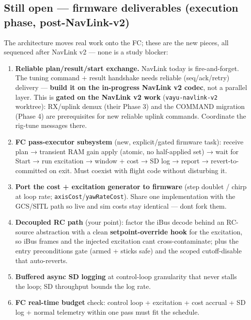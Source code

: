 \documentclass[
  11pt,
]{article}
\providecommand{\tightlist}{%
  \setlength{\itemsep}{0pt}\setlength{\parskip}{0pt}}
\begin{document}
\hypertarget{still-open--firmware-deliverables-execution-phase-post-navlink-v2}{%
\subsection{Still open --- firmware deliverables (execution phase,
post-NavLink-v2)}\label{still-open--firmware-deliverables-execution-phase-post-navlink-v2}}

The architecture moves real work onto the FC; these are the new pieces,
all sequenced after NavLink v2 --- none is a study blocker:

\begin{enumerate}
\def\labelenumi{\arabic{enumi}.}
\tightlist
\item
  \textbf{Reliable plan/result/start exchange.} NavLink today is
  fire-and-forget. The tuning command + result handshake needs reliable
  (seq/ack/retry) delivery --- \textbf{build it on the in-progress
  NavLink v2 codec}, not a parallel layer. This is \textbf{gated on the
  NavLink v2 work} (\texttt{vayu-navlink-v2} worktree): RX/uplink demux
  (their Phase 3) and the COMMAND migration (Phase 4) are prerequisites
  for new reliable uplink commands. Coordinate the rig-tune messages
  there.
\item
  \textbf{FC pass-executor subsystem} (new, explicit/gated firmware
  task): receive plan → transient RAM gain apply (atomic, no
  half-applied set) → wait for Start → run excitation → window + cost →
  SD log → report → revert-to-committed on exit. Must coexist with
  flight code without disturbing it.
\item
  \textbf{Port the cost + excitation generator to firmware} (step
  doublet / chirp at loop rate; \texttt{axisCost}/\texttt{yawRateCost}).
  Share one implementation with the GCS/SITL path so live and sim costs
  stay identical --- don\textquotesingle t fork them.
\item
  \textbf{Decoupled RC path} (your point): factor the iBus decode behind
  an RC-source abstraction with a clean \textbf{setpoint-override hook}
  for the excitation, so iBus frames and the injected excitation
  can\textquotesingle t cross-contaminate; plus the entry preconditions
  gate (armed + sticks safe) and the scoped cutoff-disable that
  auto-reverts.
\item
  \textbf{Buffered async SD logging} at control-loop granularity that
  never stalls the loop; SD throughput bounds the log rate.
\item
  \textbf{FC real-time budget} check: control loop + excitation + cost
  accrual + SD log + normal telemetry within one pass must fit the
  schedule.
\end{enumerate}
\end{document}
